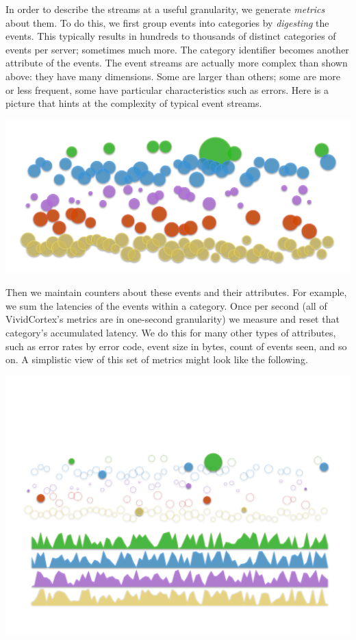 \documentclass{vivid_layout}
\begin{document}
In order to describe the streams at a useful granularity, we generate
\emph{metrics} about them. To do this, we first group events into categories by
\emph{digesting} the events. This typically results in hundreds to thousands of
distinct categories of events per server; sometimes much more. The category
identifier becomes another attribute of the events. The event streams are
actually more complex than shown above: they have many dimensions. Some are
larger than others; some are more or less frequent, some have particular
characteristics such as errors. Here is a picture that hints at the complexity of
typical event streams.

\begin{center}
\includegraphics[width=.85\linewidth]{sketch-sampling/complex-event-stream}
\end{center}

Then we maintain counters about these events and their attributes. For example,
we sum the latencies of the events within a category. Once per second (all of
VividCortex's metrics are in one-second granularity) we measure and reset that
category's accumulated latency. We do this for many other types of attributes,
such as error rates by error code, event size in bytes, count of events seen,
and so on. A simplistic view of this set of metrics might look like the
following.

\begin{center}
\includegraphics[width=.85\linewidth]{sketch-sampling/complex-event-metrics}
\end{center}
\end{document}
